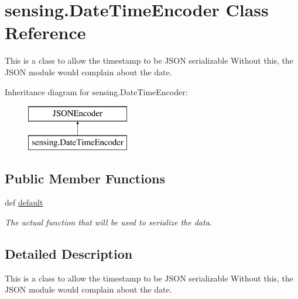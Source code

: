\hypertarget{classsensing_1_1_date_time_encoder}{\section{sensing.\-Date\-Time\-Encoder Class Reference}
\label{classsensing_1_1_date_time_encoder}
}


This is a class to allow the timestamp to be J\-S\-O\-N serializable Without this, the J\-S\-O\-N module would complain about the date.  


Inheritance diagram for sensing.\-Date\-Time\-Encoder\-:\begin{figure}[H]
\begin{center}
\leavevmode
\includegraphics[height=2.000000cm]{classsensing_1_1_date_time_encoder}
\end{center}
\end{figure}
\subsection*{Public Member Functions}
\begin{DoxyCompactItemize}
\item 
def \hyperlink{classsensing_1_1_date_time_encoder_af1e78b9ab902827d191204c63217f87d}{default}
\begin{DoxyCompactList}\small\item\em The actual function that will be used to serialize the data. \end{DoxyCompactList}\end{DoxyCompactItemize}


\subsection{Detailed Description}
This is a class to allow the timestamp to be J\-S\-O\-N serializable Without this, the J\-S\-O\-N module would complain about the date. 

